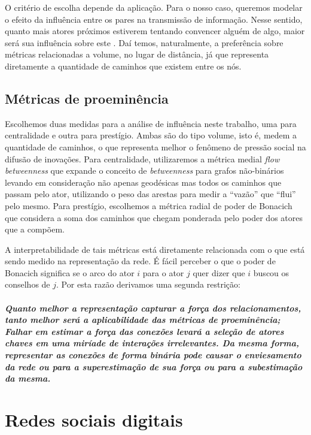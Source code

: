 \documentclass{article}
\begin{document}
O critério de escolha depende da aplicação. Para o nosso caso, queremos modelar
o efeito da influência entre os pares na transmissão de informação. Nesse
sentido, quanto mais atores próximos estiverem tentando convencer alguém de
algo, maior será sua influência sobre este \cite{Watts2007}. Daí temos,
naturalmente, a preferência sobre métricas relacionadas a volume, no lugar de distância, já que
representa diretamente a quantidade de caminhos que existem entre os nós.

\subsection{Métricas de proeminência}

Escolhemos duas medidas para a análise de influência neste trabalho, uma para
centralidade e outra para prestígio. Ambas são do tipo volume, isto é, medem a
quantidade de caminhos, o que representa melhor o fenômeno de pressão social na
difusão de inovações. Para centralidade, utilizaremos a métrica medial
\textit{flow betweenness} que expande o conceito de \textit{betweenness} para
grafos não-binários \cite{Freeman1991} levando em consideração não apenas
geodésicas mas todos os caminhos que passam pelo ator, utilizando o peso das
arestas para medir a ``vazão'' que ``flui'' pelo mesmo. Para prestígio,
escolhemos a métrica radial de poder de Bonacich \cite{Bonacich1987} que
considera a soma dos caminhos que chegam ponderada pelo poder dos atores que a
compõem.

A interpretabilidade de tais métricas está diretamente relacionada com o que está
sendo medido na representação da rede. É fácil perceber o que o poder de Bonacich
significa se o arco do ator $i$ para o ator $j$ quer dizer que $i$ buscou os
conselhos de $j$. Por esta razão derivamos uma segunda restrição:

\paragraph{\emph{Quanto melhor a representação capturar a força dos
relacionamentos, tanto melhor será a aplicabilidade das métricas de proeminência;
Falhar em estimar a força das conexões levará a seleção de atores chaves em uma
miríade de interações irrelevantes. Da mesma forma, representar as conexões de
forma binária pode causar o enviesamento da rede ou para a superestimação de sua
força ou para a subestimação da mesma.}}

\section{Redes sociais digitais}
\end{document}
